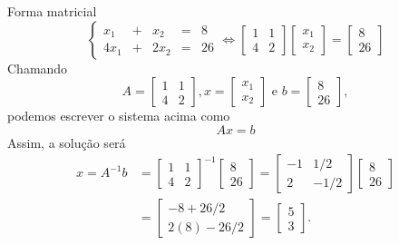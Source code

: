 \documentclass[hyperref={pdfpagelabels=false}]{beamer}
\begin{document}
\begin{frame}{Forma matricial}
  \begin{equation*}
    \left\{ 
    \begin{matrix} 
      x_1&+&x_2&=&8\\
      4x_1&+&2x_2&=&26 
    \end{matrix} 
    \right. \Leftrightarrow 
    \begin{bmatrix} 
      1 & 1\\
      4 & 2 
    \end{bmatrix} 
    \begin{bmatrix}
      x_1\\
      x_2
    \end{bmatrix}
    =
    \begin{bmatrix}
      8\\
      26
    \end{bmatrix}
  \end{equation*}
  Chamando 
  \begin{equation*}
    A = \begin{bmatrix} 1&1\\4&2 \end{bmatrix}, x = \begin{bmatrix} x_1\\x_2
    \end{bmatrix} \mbox{ e } b=\begin{bmatrix}8\\26\end{bmatrix},
  \end{equation*}
  podemos escrever o sistema acima como
  $$Ax=b$$
  Assim, a solução será
  \begin{align*}
    x= A^{-1}b &= 
    \begin{bmatrix}
      1 & 1\\
      4 & 2
    \end{bmatrix}^{-1} 
    \begin{bmatrix} 
      8\\
      26 
    \end{bmatrix}
    =
    \begin{bmatrix}
      -1 &1/2\\
      2 & -1/2
    \end{bmatrix}
    \begin{bmatrix} 
      8\\
      26
    \end{bmatrix}
    \\&= 
    \begin{bmatrix}
      -8+26/2\\
      2(8)-26/2
    \end{bmatrix}
    = 
    \begin{bmatrix}
      5\\ 3
    \end{bmatrix}
    .
  \end{align*}
\end{frame}
\end{document}
